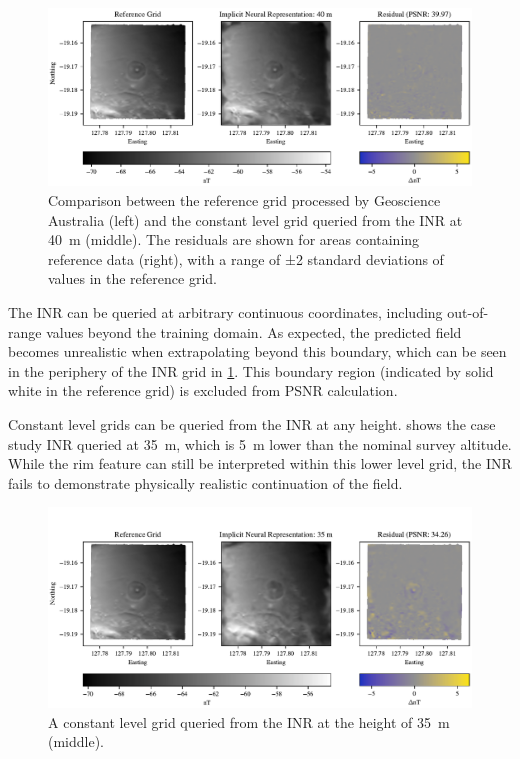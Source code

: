 \documentclass[manuscript.tex]{subfiles}
\begin{document}
\begin{figure}[hbt]
    \centering{}
    \includegraphics[width=1.0\linewidth]{fig/p3/P864_grid_comparison_40m.pdf}
    \caption[Grid prediction (40 m)]{Comparison between the reference grid processed by Geoscience Australia (left) and the constant level grid queried from the INR at \SI{40}{\m} (middle). The residuals are shown for areas containing reference data (right), with a range of ±2 standard deviations of values in the reference grid.}
    \label{fig:grid}
\end{figure}

The INR can be queried at arbitrary continuous coordinates, including out-of-range values beyond the training domain.
As expected, the predicted field becomes unrealistic when extrapolating beyond this boundary, which can be seen in the periphery of the INR grid in \cref{fig:grid}.
This boundary region (indicated by solid white in the reference grid) is excluded from PSNR calculation.

Constant level grids can be queried from the INR at any height.
 shows the case study INR queried at \SI{35}{\m}, which is \SI{5}{\m} lower than the nominal survey altitude.
While the rim feature can still be interpreted within this lower level grid, the INR fails to demonstrate physically realistic continuation of the field.

\begin{figure}[hbt]
    \centering{}
    \includegraphics[width=1.0\linewidth]{fig/p3/P864_grid_comparison_35m.pdf}
    \caption[Grid prediction (35 m)]{A constant level grid queried from the INR at the height of \SI{35}{\m} (middle).}
    \label{fig:grid35}
\end{figure}
\end{document}
